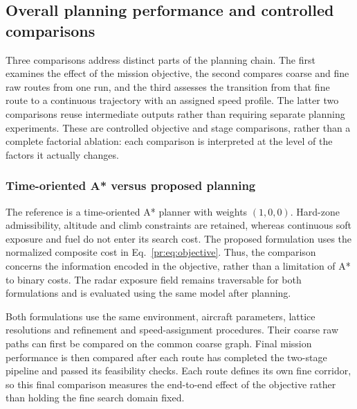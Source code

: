 \documentclass[preprint,12pt]{elsarticle}
\begin{document}
\subsection{Overall planning performance and controlled comparisons}
\label{sec:ablation}

Three comparisons address distinct parts of the planning chain. The first
examines the effect of the mission objective, the second compares coarse
and fine raw routes from one run, and the third assesses the transition
from that fine route to a continuous trajectory with an assigned speed
profile. The latter two comparisons reuse intermediate outputs rather
than requiring separate planning experiments. These are controlled objective
and stage comparisons, rather than a complete factorial ablation: each
comparison is interpreted at the level of the factors it actually changes.


\subsubsection{Time-oriented A* versus proposed planning}
\label{sec:objective_comparison}

The reference is a time-oriented A* planner with weights $(1,0,0)$.
Hard-zone admissibility, altitude and climb constraints are retained,
whereas continuous soft exposure and fuel do not enter its search cost.
The proposed formulation uses the normalized composite cost in
Eq.~\eqref{pr:eq:objective}. Thus, the comparison concerns the information
encoded in the objective, rather than a limitation of A* to binary costs.
The radar exposure field remains traversable for both formulations and
is evaluated using the same model after planning.

Both formulations use the same environment, aircraft parameters, lattice
resolutions and refinement and speed-assignment procedures. Their coarse
raw paths can first be compared on the common coarse graph. Final mission
performance is then compared after each route has completed the two-stage
pipeline and passed its feasibility checks. Each route defines its own
fine corridor, so this final comparison measures the end-to-end effect
of the objective rather than holding the fine search domain fixed.
\end{document}
